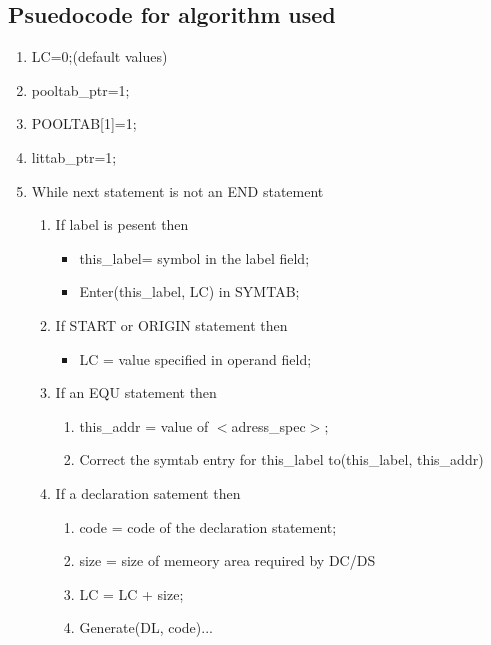 \documentclass{scrreprt}
\begin{document}
\subsection{Psuedocode for algorithm used}
\begin{enumerate}
\item LC=0;(default values)
\item[]pooltab_ptr=1; 
\item[]POOLTAB[1]=1;
\item[]littab_ptr=1;
\item While next statement is not an END statement
\begin{enumerate}
\item If label is pesent then 
\begin{itemize}
\item[] this_label= symbol in the label field;
\item[] Enter(this_label, LC) in SYMTAB;
\end{itemize}

\item If START or ORIGIN statement then
\begin{itemize}
\item[] LC = value specified in operand field;
\end{itemize}

\item If an EQU statement then
\begin{enumerate}
\item this_addr = value of $<$adress_spec$>$;
\item Correct the symtab entry for this_label to(this_label, this_addr)
\end{enumerate}

\item If a declaration satement then
\begin{enumerate}
\item code = code of the declaration statement;
\item size = size of memeory area required by DC/DS
\item LC = LC + size;
\item Generate(DL, code)...
\end{enumerate}


\end{enumerate}
\end{enumerate}
\end{document}
